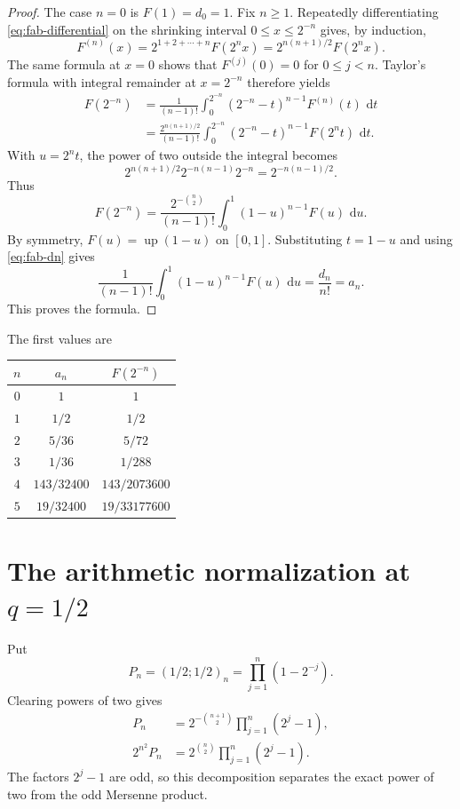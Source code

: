 \documentclass[11pt,oneside,openany]{book}
\theoremstyle{definition}
\theoremstyle{remark}
\newcommand{\dd}{\,\mathrm d}
\newcommand{\Up}{\operatorname{up}}
\begin{document}
\begin{proof}
The case $n=0$ is $F(1)=d_0=1$.  Fix $n\ge1$.  Repeatedly differentiating \eqref{eq:fab-differential} on the shrinking interval $0\le x\le2^{-n}$ gives, by induction,
\begin{equation}
 F^{(n)}(x)=2^{1+2+\cdots+n}F(2^nx)
 =2^{n(n+1)/2}F(2^nx).
 \label{eq:fab-derivative-iterate}
\end{equation}
The same formula at $x=0$ shows that $F^{(j)}(0)=0$ for $0\le j<n$.  Taylor's formula with integral remainder at $x=2^{-n}$ therefore yields
\begin{align*}
 F(2^{-n})
 &=\frac1{(n-1)!}\int_0^{2^{-n}}
       (2^{-n}-t)^{n-1}F^{(n)}(t)\,\dd t\\
 &=\frac{2^{n(n+1)/2}}{(n-1)!}
   \int_0^{2^{-n}}(2^{-n}-t)^{n-1}F(2^nt)\,\dd t.
\end{align*}
With $u=2^nt$, the power of two outside the integral becomes
\[
 2^{n(n+1)/2}2^{-n(n-1)}2^{-n}=2^{-n(n-1)/2}.
\]
Thus
\[
 F(2^{-n})
 =\frac{2^{-\binom n2}}{(n-1)!}
  \int_0^1(1-u)^{n-1}F(u)\,\dd u.
\]
By symmetry, $F(u)=\Up(1-u)$ on $[0,1]$.  Substituting $t=1-u$ and using \eqref{eq:fab-dn} gives
\[
 \frac1{(n-1)!}\int_0^1(1-u)^{n-1}F(u)\,\dd u
 =\frac{d_n}{n!}=a_n.
\]
This proves the formula.
\end{proof}

The first values are
\begin{center}
\begin{tabular}{c@{\qquad}c@{\qquad}c}
\toprule
$n$ & $a_n$ & $F(2^{-n})$\\
\midrule
$0$ & $1$ & $1$\\
$1$ & $1/2$ & $1/2$\\
$2$ & $5/36$ & $5/72$\\
$3$ & $1/36$ & $1/288$\\
$4$ & $143/32400$ & $143/2073600$\\
$5$ & $19/32400$ & $19/33177600$\\
\bottomrule
\end{tabular}
\end{center}

\section{The arithmetic normalization at \texorpdfstring{$q=1/2$}{q=1/2}}

Put
\begin{equation}
 P_n=(1/2;1/2)_n=\prod_{j=1}^n(1-2^{-j}).
 \label{eq:fab-Pn}
\end{equation}
Clearing powers of two gives
\begin{align}
 P_n&=2^{-\binom{n+1}{2}}\prod_{j=1}^n(2^j-1),\label{eq:fab-Pn-mersenne}\\
 2^{n^2}P_n&=2^{\binom n2}\prod_{j=1}^n(2^j-1).
 \label{eq:fab-Pn-normalizer}
\end{align}
The factors $2^j-1$ are odd, so this decomposition separates the exact power of two from the odd Mersenne product.
\end{document}
